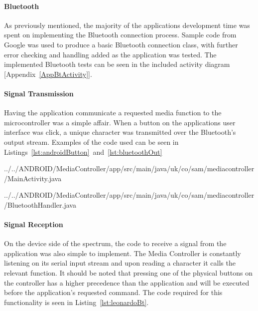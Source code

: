 \documentclass{article}
\begin{document}
			\paragraph{Bluetooth}
			As previously mentioned, the majority of the applications development time was spent on implementing the Bluetooth connection process. Sample code from Google \cite{GoogleBluetooth:online} was used to produce a basic Bluetooth connection class, with further error checking and handling added as the application was tested. The implemented Bluetooth tests can be seen in the included activity diagram [Appendix~\ref{AppBtActivity}].
			
			\paragraph{Signal Transmission}
			Having the application communicate a requested media function to the microcontroller was a simple affair. When a button on the applications user interface was click, a unique character was transmitted over the Bluetooth's output stream. Examples of the code used can be seen in Listings~\ref{lst:androidButton}~and~\ref{lst:bluetoothOut}
			
			 {../../ANDROID/MediaController/app/src/main/java/uk/co/sam/mediacontroller/MainActivity.java}
			
			 {../../ANDROID/MediaController/app/src/main/java/uk/co/sam/mediacontroller/BluetoothHandler.java}
			
			\paragraph{Signal Reception}
			On the device side of the spectrum, the code to receive a signal from the application was also simple to implement. The Media Controller is constantly listening on its serial input stream and upon reading a character it calls the relevant function. It should be noted that pressing one of the physical buttons on the controller has a higher precedence than the application and will be executed before the application's requested command. The code required for this functionality is seen in Listing~\ref{lst:leonardoBt}.
			
\end{document}
